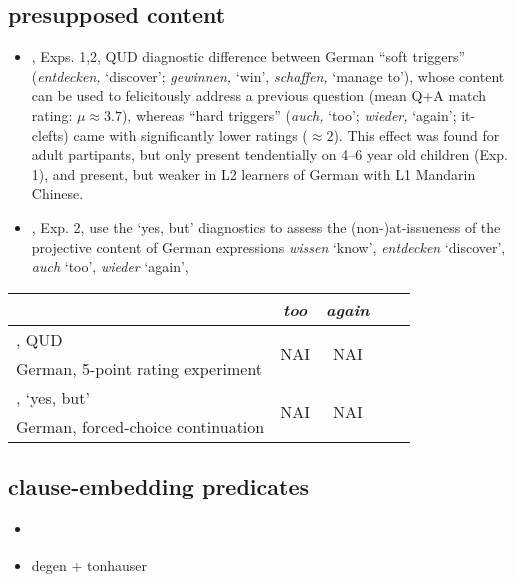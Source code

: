 \documentclass[times,linguex,xcolor]{glossa}
\begin{document}
  \subsection{presupposed content}

    \begin{itemize}
      \item \citealt{chen_presuppositions_2024}, Exps. 1,2, QUD diagnostic difference between German \enquote{soft triggers} (\emph{entdecken,} ‘discover’; \emph{gewinnen,} ‘win’, \emph{schaffen,} ‘manage to’), whose content can be used to felicitously address a previous question (mean Q+A match rating: $\mu \approx 3.7$), whereas \enquote{hard triggers} (\emph{auch,} ‘too’; \emph{wieder,} ‘again’; it-clefts) came with significantly lower ratings ($\approx 2$). This effect was found for adult partipants, but only present tendentially on 4--6 year old children (Exp. 1), and present, but weaker in L2 learners of German with L1 Mandarin Chinese.

      \item \citealt{xue_correlation_2011}, Exp. 2, use the `yes, but' diagnostics to assess the (non-)at-issueness of the projective content of German expressions \emph{wissen} `know',  \emph{entdecken} `discover',  \emph{auch} `too',  \emph{wieder} `again',  

    \end{itemize}

    \begin{tabular}{l c c c c}\toprule
            & \emph{too} 
              & \emph{again}
                        \\\midrule
        
        \citealt{chen_presuppositions_2024}, QUD
            & \multirow{2}{*}{NAI}
              & \multirow{2}{*}{NAI}
                        \\ 
        \scriptsize German, 5-point rating experiment  &  \\ \midrule

        \citealt{xue_correlation_2011}, `yes, but'
            & \multirow{2}{*}{NAI}
              & \multirow{2}{*}{NAI}
                        \\ 
        \scriptsize German, forced-choice continuation  &  \\ \midrule

    \end{tabular}

  \subsection{clause-embedding predicates}
    \begin{itemize}
      \item \citealt{tonhauser_how_2018}
      \item degen + tonhauser
    \end{itemize}
\end{document}
